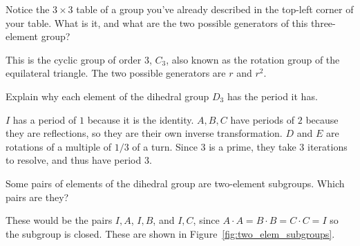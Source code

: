 \documentclass[../gatm_answers.tex]{subfiles}
\begin{document}
\begin{outer_problem}
\item Notice the $3\times 3$ table of a group you've already described in the top-left corner of your table. What is it, and what are the two possible generators of this three-element group?
\end{outer_problem}

\noindent This is the cyclic group of order $3$, $C_3$, also known as the rotation group of the equilateral triangle. The two possible generators are $r$ and $r^2$.

\begin{outer_problem}
\item Explain why each element of the dihedral group $D_3$ has the period it has.
\end{outer_problem}

\noindent$I$ has a period of $1$ because it is the identity. $A,B,C$ have periods of $2$ because they are reflections, so they are their own inverse transformation. $D$ and $E$ are rotations of a multiple of $1/3$ of a turn. Since $3$ is a prime, they take $3$ iterations to resolve, and thus have period $3$.

\begin{outer_problem}
\item Some pairs of elements of the dihedral group are two-element subgroups. Which pairs are they?
\end{outer_problem}

\noindent These would be the pairs ${I,A}$, ${I,B}$, and ${I,C}$, since $A\cdot A=B\cdot B=C\cdot C = I$ so the subgroup is closed. These are shown in Figure~\ref{fig:two_elem_subgroups}.
\end{document}
